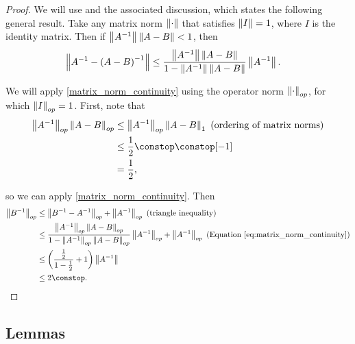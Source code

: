 \begin{proof}
We will use \citet[Theorem 5.20]{schott:2016:matrix} and the associated
discussion, which states the following general result. Take any matrix
norm $\left\Vert \cdot\right\Vert$ that satisfies $\left\Vert I\right\Vert=1$, where $I$ is the
identity matrix. Then if $\left\Vert A^{-1}\right\Vert\left\Vert A-B\right\Vert<1$, then
\begin{align}
\left\Vert A^{-1}-\left(A-B\right)^{-1}\right\Vert & \le\frac{\left\Vert A^{-1}\right\Vert\left\Vert A-B\right\Vert}{1-\left\Vert A^{-1}\right\Vert\left\Vert A-B\right\Vert}\left\Vert A^{-1}\right\Vert.\label{eq:matrix_norm_continuity}
\end{align}

We will apply \eqref{matrix_norm_continuity} using the operator norm
$\left\Vert \cdot\right\Vert_{op}$, for which $\left\Vert I\right\Vert_{op}=1$. First, note that
\begin{align*}
\norm{A^{-1}}_{op}\norm{A-B}_{op} & \le\norm{A^{-1}}_{op}\norm{A-B}_{1}\textrm{ (ordering of matrix norms)}\\
 & \le\frac{1}{2}\constop\constop[-1]\\
 & =\frac{1}{2},
\end{align*}

so we can apply \eqref{matrix_norm_continuity}. Then
\begin{align*}
\norm{B^{-1}}_{op}
 & \le \norm{B^{-1}-A^{-1}}_{op}+\norm{A^{-1}}_{op}\textrm{ (triangle inequality)}\\
 & \le\frac{\norm{A^{-1}}_{op}\norm{A-B}_{op}}{1-\norm{A^{-1}}_{op}\norm{A-B}_{op}}\norm{A^{-1}}_{op}+\norm{A^{-1}}_{op}\textrm{ (Equation \ref{eq:matrix_norm_continuity})}\\
 & \le\left(\frac{\frac{1}{2}}{1-\frac{1}{2}}+1\right)\norm{A^{-1}}\\
 & \le2\constop.
\end{align*}
\end{proof}








\subsection{Lemmas}


